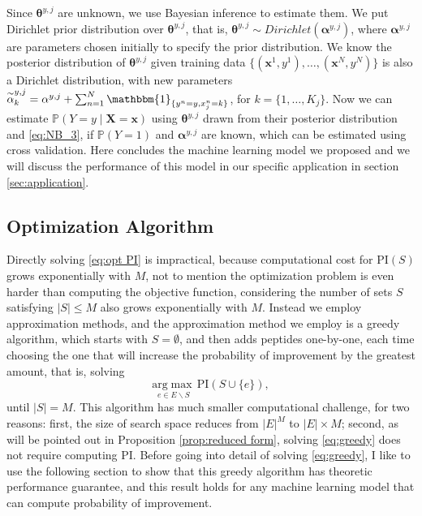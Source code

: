 \documentclass[11pt]{article}
\newcommand{\Prob}{\mathbb{P}}
\newcommand{\PI}{\text{PI}}
\begin{document}
Since $\bm{\theta}^{y, j}$ are unknown, we use Bayesian inference to estimate them. We 
put Dirichlet prior distribution over $\bm{\theta}^{y, j}$, that is,
$\bm{\theta}^{y, j} \sim Dirichlet(\bm{\alpha}^{y, j})$, where $\bm{\alpha}^{y, j}$
are parameters chosen initially to specify the prior distribution. We know the
posterior distribution of $\bm{\theta}^{y, j}$ given training data $\{(\bm{x}^1, y^1), 
\ldots, (\bm{x}^N, y^N)\}$ is also a Dirichlet distribution, with new parameters
$\overset{\sim}{\alpha}^{y, j}_k = \alpha^{y, j} + \sum_{n=1}^N \mathbbm{1}_{\{y^n = y, x^n_j = k\}}$,
for $k = \{1, \ldots, K_j\}$. Now we can estimate $\Prob(Y = y \mid \bm{X} = \bm{x})$
using $\bm{\theta}^{y, j}$ drawn from their posterior distribution and \eqref{eq:NB_3},
if $\Prob(Y = 1)$ and $\bm{\alpha}^{y, j}$ are known, which can be estimated using
cross validation. Here concludes the machine learning model we proposed and we will
discuss the performance of this model in our specific application in section \ref{sec:application}.


\subsection{Optimization Algorithm} \label{sec:approx algo}
Directly solving \eqref{eq:opt PI} is impractical, because computational cost for $\PI(S)$
grows exponentially with $M$, not to mention the optimization problem is even harder than
computing the objective function, considering the number of sets $S$ satisfying $|S| \leq M$
also grows exponentially with $M$. Instead we employ approximation methods, and the approximation
method we employ is a greedy algorithm, which starts with $S = \emptyset$, and then adds
peptides one-by-one, each time choosing the one that will increase the probability of 
improvement by the greatest amount, that is, solving 
\begin{equation}
  \underset{e \in E \backslash S}{\mathrm{arg}\max} \,\PI (S \cup \{e\}),
  \label{eq:greedy}
\end{equation}
until $|S| = M$. This algorithm has much smaller computational challenge, for two reasons:
first, the size of search space reduces from $|E|^M$ to $|E| \times M$; second, as will be pointed
out in Proposition \ref{prop:reduced form}, solving \eqref{eq:greedy} does not require computing $\PI$.
Before going into detail of solving \eqref{eq:greedy}, I like to use the following section
to show that this greedy algorithm has theoretic performance guarantee, and this result holds
for any machine learning model that can compute probability of improvement.
\end{document}
